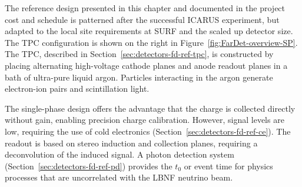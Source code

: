 The reference design presented in this chapter and documented in the
project cost and schedule is patterned after the successful ICARUS
experiment, but adapted to the local site requirements at SURF and the
scaled up detector size.  The TPC configuration is shown on the right
in Figure~\ref{fig:FarDet-overview-SP}.  The TPC, described in
Section~\ref{sec:detectors-fd-ref-tpc}, is constructed by placing
alternating high-voltage cathode planes and anode readout planes in a
bath of ultra-pure liquid argon. Particles interacting in the argon
generate electron-ion pairs and scintillation light.

The single-phase design offers the advantage that the charge is
collected directly without gain, enabling precision charge
calibration. However, signal levels are low, requiring the use of cold
electronics (Section~\ref{sec:detectors-fd-ref-ce}). The readout is
based on stereo induction and collection planes, requiring a
deconvolution of the induced signal. A photon detection system
(Section~\ref{sec:detectors-fd-ref-pd}) provides the $t_0$ or event
time for physics processes that are uncorrelated with the LBNF
neutrino beam.
